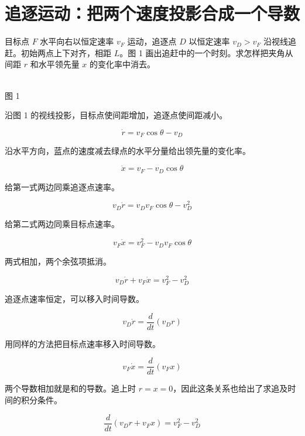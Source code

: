 \documentclass[UTF8,fontset=fandol]{ctexart}
\begin{document}
\section*{追逐运动：把两个速度投影合成一个导数}

目标点 $F$ 水平向右以恒定速率 $v_F$ 运动，追逐点 $D$ 以恒定速率 $v_D>v_F$ 沿视线追赶。初始两点上下对齐，相距 $L$。图 1 画出追赶中的一个时刻。求怎样把夹角从间距 $r$ 和水平领先量 $x$ 的变化率中消去。

\begin{center}\\ 图 1\end{center}

沿图 1 的视线投影，目标点使间距增加，追逐点使间距减小。

\begin{equation}\dot r=v_F\cos\theta-v_D\label{eq:s1}\end{equation}

沿水平方向，蓝点的速度减去绿点的水平分量给出领先量的变化率。

\begin{equation}\dot x=v_F-v_D\cos\theta\label{eq:s2}\end{equation}

给第一式两边同乘追逐点速率。

\begin{equation}v_D\dot r=v_Dv_F\cos\theta-v_D^2\label{eq:s3}\end{equation}

给第二式两边同乘目标点速率。

\begin{equation}v_F\dot x=v_F^2-v_Dv_F\cos\theta\label{eq:s4}\end{equation}

两式相加，两个余弦项抵消。

\begin{equation}v_D\dot r+v_F\dot x=v_F^2-v_D^2\label{eq:s5}\end{equation}

追逐点速率恒定，可以移入时间导数。

\begin{equation}v_D\dot r=\frac{d}{dt}(v_Dr)\label{eq:s6}\end{equation}

用同样的方法把目标点速率移入时间导数。

\begin{equation}v_F\dot x=\frac{d}{dt}(v_Fx)\label{eq:s7}\end{equation}

两个导数相加就是和的导数。追上时 $r=x=0$，因此这条关系也给出了求追及时间的积分条件。

\begin{equation}\frac{d}{dt}(v_Dr+v_Fx)=v_F^2-v_D^2\label{eq:s8}\end{equation}
\end{document}
